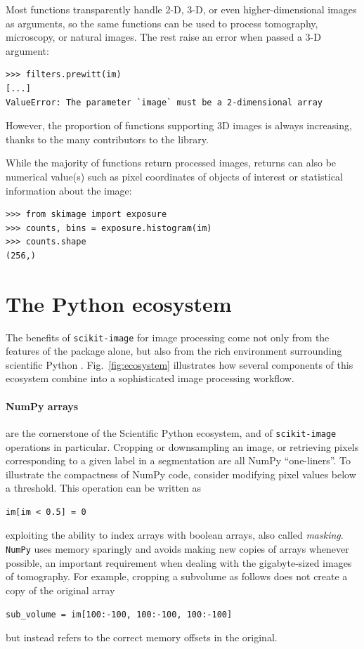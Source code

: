 \documentclass[twocolumn]{bmcart}%
\begin{document}
Most functions transparently handle 2-D, 3-D, or even higher-dimensional
images as arguments, so
the same functions can be used to process tomography, microscopy, or natural
images. The rest raise an error when passed a 3-D argument:
\begin{lstlisting}
>>> filters.prewitt(im)
[...]
ValueError: The parameter `image` must be a 2-dimensional array
\end{lstlisting}
However, the proportion of functions supporting 3D images is always increasing,
thanks to the many contributors to the library.

While the majority of functions return processed images, returns can
also be numerical value(s) such as pixel coordinates of objects of
interest or statistical information about the image:
\begin{lstlisting}
>>> from skimage import exposure
>>> counts, bins = exposure.histogram(im)
>>> counts.shape
(256,)
\end{lstlisting}

\section*{The Python ecosystem}

The benefits of \texttt{scikit-image} for image processing come not only
from the features of the package alone, but also from the rich
environment surrounding scientific Python \citep{Oliphant2007, Perez2011}.
Fig.~\ref{fig:ecosystem} illustrates how several components of this
ecosystem combine into a sophisticated image processing workflow.

\paragraph{NumPy arrays} are the cornerstone of the Scientific Python
ecosystem, and of \texttt{scikit-image} operations in particular.
Cropping or downsampling an image, or retrieving pixels corresponding to
a given label in a segmentation are all NumPy ``one-liners''. To
illustrate the compactness of NumPy code, consider modifying pixel values below a
threshold.  This operation can be written as
\begin{lstlisting}
im[im < 0.5] = 0
\end{lstlisting}
exploiting the ability to index arrays with boolean arrays, also called
\emph{masking}. \texttt{NumPy} uses memory sparingly and avoids
making new copies of arrays whenever possible, an important
requirement when dealing with the gigabyte-sized images of tomography.
For example, cropping a subvolume as follows does not create a copy of the
original array
\begin{lstlisting}
sub_volume = im[100:-100, 100:-100, 100:-100]
\end{lstlisting}
but instead refers to the correct memory offsets in the original.
\end{document}
